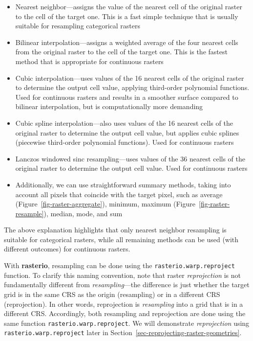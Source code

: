 \documentclass[
  letterpaper,
]{krantz}
\providecommand{\tightlist}{%
  \setlength{\itemsep}{0pt}\setlength{\parskip}{0pt}}\usepackage{longtable,booktabs,array}
\begin{document}
\begin{itemize}
\tightlist
\item
  Nearest neighbor---assigns the value of the nearest cell of the
  original raster to the cell of the target one. This is a fast simple
  technique that is usually suitable for resampling categorical rasters
\item
  Bilinear interpolation---assigns a weighted average of the four
  nearest cells from the original raster to the cell of the target one.
  This is the fastest method that is appropriate for continuous rasters
\item
  Cubic interpolation---uses values of the 16 nearest cells of the
  original raster to determine the output cell value, applying
  third-order polynomial functions. Used for continuous rasters and
  results in a smoother surface compared to bilinear interpolation, but
  is computationally more demanding
\item
  Cubic spline interpolation---also uses values of the 16 nearest cells
  of the original raster to determine the output cell value, but applies
  cubic splines (piecewise third-order polynomial functions). Used for
  continuous rasters
\item
  Lanczos windowed sinc resampling---uses values of the 36 nearest cells
  of the original raster to determine the output cell value. Used for
  continuous rasters
\item
  Additionally, we can use straightforward summary methods, taking into
  account all pixels that coincide with the target pixel, such as
  average (Figure~\ref{fig-raster-aggregate}), minimum, maximum
  (Figure~\ref{fig-raster-resample}), median, mode, and sum
\end{itemize}

The above explanation highlights that only nearest neighbor resampling
is suitable for categorical rasters, while all remaining methods can be
used (with different outcomes) for continuous rasters.

With \textbf{rasterio}, resampling can be done using the
\texttt{rasterio.warp.reproject} function. To clarify this naming
convention, note that raster \emph{reprojection} is not fundamentally
different from \emph{resampling}---the difference is just whether the
target grid is in the same CRS as the origin (resampling) or in a
different CRS (reprojection). In other words, reprojection is
\emph{resampling} into a grid that is in a different CRS. Accordingly,
both resampling and reprojection are done using the same function
\texttt{rasterio.warp.reproject}. We will demonstrate
\emph{reprojection} using \texttt{rasterio.warp.reproject} later in
Section~\ref{sec-reprojecting-raster-geometries}.
\end{document}
